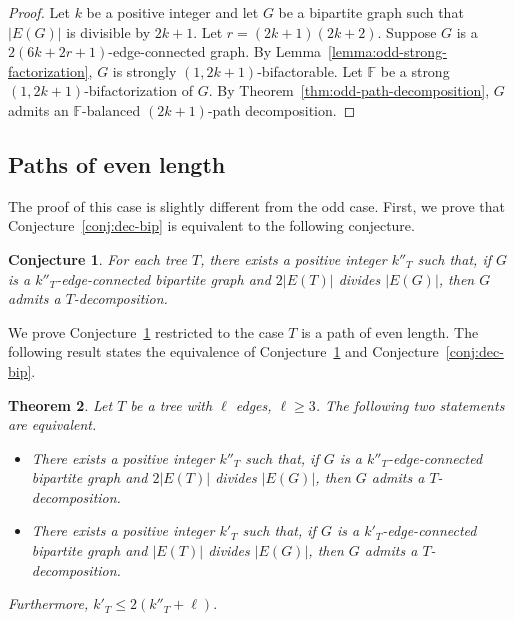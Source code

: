 \documentclass[12pt,reqno,a4paper]{amsart}
\newtheorem{theorem}{Theorem}[section]
\newtheorem{conjecture}[theorem]{Conjecture}
\newtheorem{corollary}[theorem]{Corollary}
\begin{document}
\begin{proof}
	Let \(k\) be a positive integer and let \(G\) be a bipartite graph such 
that \(|E(G)|\) is divisible by \(2k+1\). Let \(r = (2k+1)(2k+2)\).
	Suppose \(G\) is a \(2(6k + 2r+1)\)-edge-connected graph.
	By Lemma~\ref{lemma:odd-strong-factorization},
	\(G\) is strongly \((1,2k+1)\)-bifactorable.
	Let \(\mathbb{F}\) be a strong \((1,2k+1)\)-bifactorization of \(G\).
	By Theorem~\ref{thm:odd-path-decomposition}, 
	\(G\) admits an \(\mathbb{F}\)-balanced $(2k+1)$-path decomposition.
\end{proof}

\subsection{Paths of even length}

The proof of this case is slightly different from the odd case.
First, we prove that Conjecture~\ref{conj:dec-bip} is equivalent to the 
following conjecture.
\begin{conjecture}\label{conj:dec-bip2}
For each tree $T$, there exists a positive integer
$k''_T$ such that, if $G$ is a $k''_T$-edge-connected bipartite graph
and $2|E(T)|$ divides $|E(G)|$, then \(G\) admits a \hbox{\(T\)-decomposition.}
\end{conjecture}
We prove Conjecture~\ref{conj:dec-bip2} restricted to the case 
\(T\)  is a path of even length.
The following result states the equivalence of 
Conjecture~\ref{conj:dec-bip2} 
and Conjecture~\ref{conj:dec-bip}.

\begin{theorem}\label{theorem:conj-equivalence2}
Let $T$ be a tree with \(\ell\) edges, \(\ell \geq 3\). The following two statements are
equivalent.
\begin{itemize}
\item[(i)] There exists a positive integer $k''_T$ such that, if $G$ is a 
$k''_T$-edge-connected 
		bipartite graph and $2|E(T)|$ divides $|E(G)|$, then $G$ admits 
a $T$-decomposition.
\item[(ii)] There exists a positive integer $k'_T$ such that, if $G$ is a 
$k'_T$-edge-connected bipartite graph and $|E(T)|$ divides $|E(G)|$, then $G$ admits 
a 
$T$-decomposition.
\end{itemize}
	Furthermore, 
	\(
		k'_T\leq 2(k''_T + \ell).
	\)
\end{theorem}
\end{document}
